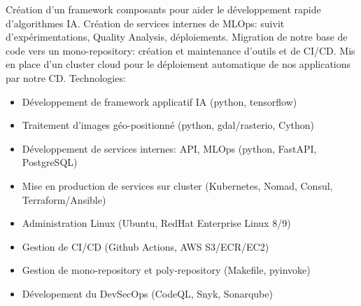 {  \else
  Création d'un framework composants pour aider le développement rapide d'algorithmes IA.\newline{}
  Création de services internes de MLOps: suivit d’expérimentations, Quality Analysis, déploiements.\newline{}
  Migration de notre base de code vers un mono-repository: création et maintenance d'outils et de CI/CD.\newline{}
  Mis en place d'un cluster cloud pour le déploiement automatique de nos applications par notre CD.\newline{}
  Technologies:
  \begin{itemize}
    \item Développement de framework applicatif IA (python, tensorflow)
    \item Traitement d'images géo-positionné (python, gdal/rasterio, Cython)
    \item Développement de services internes: API, MLOps (python, FastAPI, PostgreSQL) 
    \item Mise en production de services sur cluster (Kubernetes, Nomad, Consul, Terraform/Ansible)
    \item Administration Linux (Ubuntu, RedHat Enterprise Linux 8/9)
    \item Gestion de CI/CD (Github Actions, AWS S3/ECR/EC2)
    \item Gestion de mono-repository et poly-repository (Makefile, pyinvoke)
    \item Dévelopement du DevSecOps (CodeQL, Snyk, Sonarqube)
  \end{itemize}
  \fi
}




